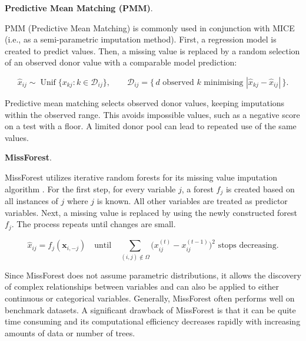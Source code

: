 \par\medskip
\noindent\textbf{Predictive Mean Matching (PMM)}.\par\nobreak

PMM (Predictive Mean Matching) is commonly used in conjunction with MICE (i.e., as a semi-parametric imputation method). First, a regression model is created to predict values. Then, a missing value is replaced by a random selection of an observed donor value with a comparable model prediction:

\begin{equation}\label{eq:pmm}
\hat{x}_{ij}\sim\operatorname{Unif}\bigl\{x_{kj}:k\in\mathcal{D}_{ij}\bigr\},\qquad
\mathcal{D}_{ij}=\bigl\{\,d\text{ observed }k\text{ minimising }|\hat{x}_{kj}-\hat{x}_{ij}|\,\bigr\}.
\end{equation}

Predictive mean matching selects observed donor values, keeping imputations within the observed range. This avoids impossible values, such as a negative score on a test with a floor. A limited donor pool can lead to repeated use of the same values.

\par\medskip
\noindent\textbf{MissForest}.\par\nobreak

MissForest utilizes iterative random forests for its missing value imputation algorithm \parencite{stekhoven2012missforest}. For the first step, for every variable \(j\), a forest \(f_j\) is created based on all instances of \(j\) where \(j\) is known. All other variables are treated as predictor variables. Next, a missing value is replaced by using the newly constructed forest \(f_j\). The process repeats until changes are small.

\begin{equation}\label{eq:missforest}
\hat{x}_{ij}=f_j\!\left(\mathbf{x}_{i,-j}\right)\quad\text{until}\quad \sum_{(i,j)\notin\Omega}\bigl(x_{ij}^{(t)}-x_{ij}^{(t-1)}\bigr)^2 \text{ stops decreasing.}
\end{equation}

Since MissForest does not assume parametric distributions, it allows the discovery of complex relationships between variables and can also be applied to either continuous or categorical variables. Generally, MissForest often performs well on benchmark datasets. A significant drawback of MissForest is that it can be quite time consuming and its computational efficiency decreases rapidly with increasing amounts of data or number of trees.

